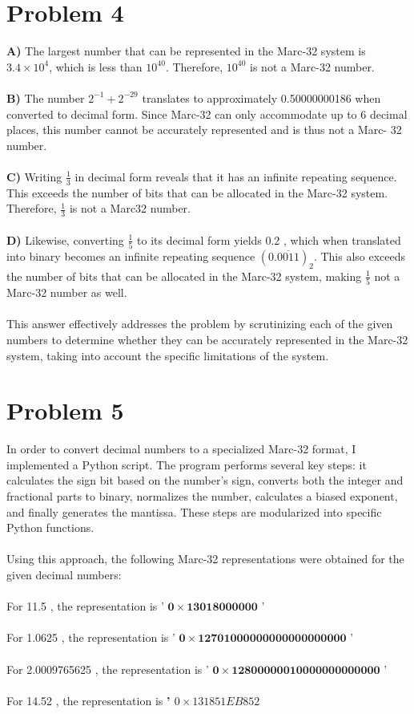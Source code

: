\documentclass{article}
\begin{document}
\section*{Problem 4}
\textbf{A)} The largest number that can be represented in the Marc-32 system is $3.4 \times 10^4$, which is less than $10^{40}$. Therefore, $10^{40}$ is not a Marc-32 number.
\\
\\
\textbf{B)} The number $2^{-1}+2^{-29}$ translates to approximately 0.50000000186 when converted to decimal form. Since Marc-32 can only accommodate up to 6 decimal places, this number cannot be accurately represented and is thus not a Marc- 32 number.
\\
\\
\textbf{C)} Writing $\frac{1}{3}$ in decimal form reveals that it has an infinite repeating sequence. This exceeds the number of bits that can be allocated in the Marc-32 system. Therefore, $\frac{1}{3}$ is not a Marc32 number.
\\
\\
\textbf{D)} Likewise, converting $\frac{1}{5}$ to its decimal form yields 0.2 , which when translated into binary becomes an infinite repeating sequence $(0 . \overline{0011})_2$. This also exceeds the number of bits that can be allocated in the Marc-32 system, making $\frac{1}{5}$ not a Marc-32 number as well.
\\
\\
This answer effectively addresses the problem by scrutinizing each of the given numbers to determine whether they can be accurately represented in the Marc-32 system, taking into account the specific limitations of the system.

\section*{Problem 5}
In order to convert decimal numbers to a specialized Marc-32 format, I implemented a Python script. The program performs several key steps: it calculates the sign bit based on the number's sign, converts both the integer and fractional parts to binary, normalizes the number, calculates a biased exponent, and finally generates the mantissa. These steps are modularized into specific Python functions.
\\
\\
Using this approach, the following Marc-32 representations were obtained for the given decimal numbers:
\\
\\
For 11.5 , the representation is ' $\mathbf{0} \times \mathbf{1 3 0 1 8 0 0 0 0 0 0}$ '
\\
\\
For 1.0625 , the representation is ' $\mathbf{0 \times 1 2 7 0 1 0 0 0 0 0 0 0 0 0 0 0 0 0 0 0 0 0 0}$ '
\\
\\
For 2.0009765625 , the representation is ' $\mathbf{0} \times \mathbf{1 2 8 0 0 0 0 0 0 1 0 0 0 0 0 0 0 0 0 0 0 0 0}$ '
\\
\\
For 14.52 , the representation is \textbf{' $0 \times 131851EB852$}
\end{document}
